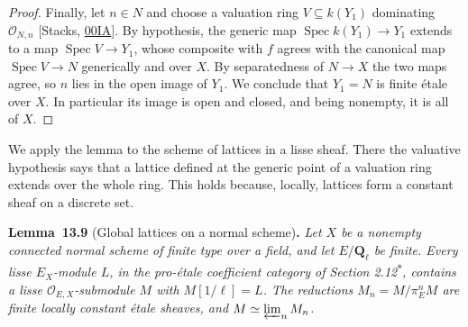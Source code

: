 \documentclass[11pt]{article}
\newenvironment{bpstatement}[2]{\par\addvspace{0.6\baselineskip}\noindent\textbf{#1}#2\textbf{.}\enspace\ignorespaces}
  {\par\addvspace{0.4\baselineskip}}
\newenvironment{bpstatementit}[2]{\begin{bpstatement}{#1}{#2}\itshape\ignorespaces}{\end{bpstatement}}
\newcommand{\bpout}[1]{#1\textsuperscript{\hyperlink{bp-outside}{\ensuremath{\ast}}}}
\begin{document}
\begin{proof}[{Proof}]
Finally, let \(n\in N\) and choose a valuation ring \(V\subseteq k(Y_1)\) dominating \(\mathcal O_{N,n}\) [Stacks, \href{https://stacks.math.columbia.edu/tag/00IA}{00IA}]. By hypothesis, the generic map \(\operatorname{Spec}k(Y_1)\to Y_1\) extends to a map \(\operatorname{Spec}V\to Y_1\), whose composite with \(f\) agrees with the canonical map \(\operatorname{Spec}V\to N\) generically and over \(X\). By separatedness of \(N\to X\) the two maps agree, so \(n\) lies in the open image of \(Y_1\). We conclude that \(Y_1=N\) is finite étale over \(X\). In particular its image is open and closed, and being nonempty, it is all of \(X\).
\end{proof}

\label{bp30}%
We apply the lemma to the scheme of lattices in a lisse sheaf. There the valuative hypothesis says that a lattice defined at the generic point of a valuation ring extends over the whole ring. This holds because, locally, lattices form a constant sheaf on a discrete set.

\label{bp31}%
\begin{bpstatementit}{Lemma~13.9}{ (Global lattices on a normal scheme)}
Let \(X\) be a nonempty connected normal scheme of finite type over a field, and let \(E/\mathbf Q_\ell\) be finite. Every lisse \(E_X\)-module \(L\), in the pro-étale coefficient category of Section \bpout{2.12}, contains a lisse \(\mathcal O_{E,X}\)-submodule \(M\) with \(M[1/\ell]=L\). The reductions \(M_n=M/\pi_E^nM\) are finite locally constant étale sheaves, and \(M\simeq\varprojlim_nM_n\).
\end{bpstatementit}
\end{document}
